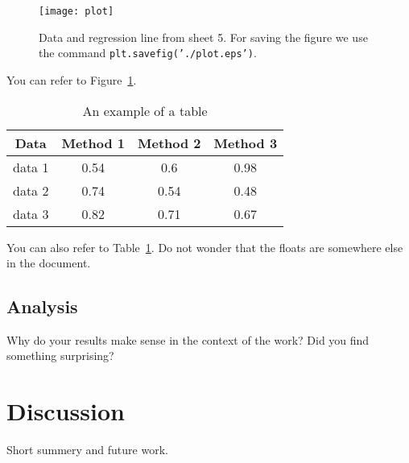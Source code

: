 \documentclass[a4paper,12pt]{article}
\begin{document}
\begin{figure}[h]
\centering
\texttt{[image: plot]}
\caption{Data and regression line from sheet 5. For saving the figure we use the command \texttt{plt.savefig('./plot.eps')}.}
\label{fig_res}
\end{figure}


You can refer to Figure~\ref{fig_res}.
\begin{table}[h]
\caption{An example of a table}
\label{tab_example}
\centering
\begin{tabular}{c||c|c|c}
Data & Method 1 & Method 2 & Method 3\\
\hline\hline
data 1 &0.54 & 0.6& 0.98\\
\hline
data 2 &0.74 & 0.54& 0.48\\
\hline
data 3 &0.82 & 0.71& 0.67
\end{tabular}
\end{table}
You can also refer to Table~\ref{tab_example}. Do not wonder that the floats are somewhere else in the document.

\subsection{Analysis}
Why do your results make sense in the context of the work? Did you find something surprising?

\section{Discussion}
Short summery and future work.
\end{document}
